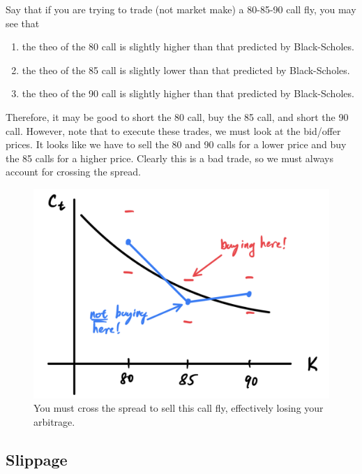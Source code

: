 \documentclass{article}
\begin{document}
    \begin{example}
      Say that if you are trying to trade (not market make) a 80-85-90 call fly, you may see that 
      \begin{enumerate}
        \item the theo of the 80 call is slightly higher than that predicted by Black-Scholes. 
        \item the theo of the 85 call is slightly lower than that predicted by Black-Scholes. 
        \item the theo of the 90 call is slightly higher than that predicted by Black-Scholes. 
      \end{enumerate}
      Therefore, it may be good to short the 80 call, buy the 85 call, and short the 90 call. However, note that to execute these trades, we must look at the bid/offer prices. It looks like we have to sell the 80 and 90 calls for a lower price and buy the 85 calls for a higher price. Clearly this is a bad trade, so we must always account for crossing the spread. 

      \begin{figure}[H]
        \centering 
        \includegraphics[scale=0.4]{img/call_fly_cross_spread.png}
        \caption{You must cross the spread to sell this call fly, effectively losing your arbitrage. } 
        \label{fig:call_fly_cross_spread}
      \end{figure}
    \end{example}

  \subsection{Slippage}
\end{document}
